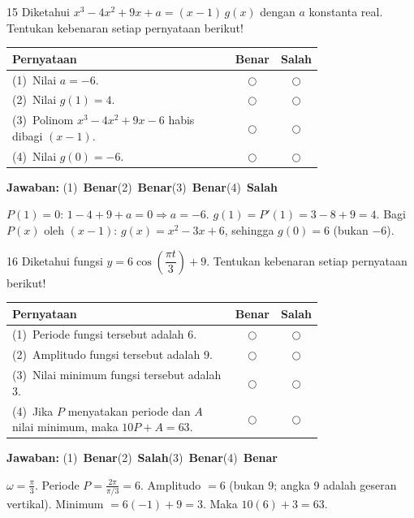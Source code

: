 \documentclass[11pt]{article}
\newcommand{\jawaban}[1]{%
  \noindent\colorbox{gold!30}{\parbox{\dimexpr\linewidth-2\fboxsep\relax}{%
    \textbf{Jawaban:} #1}}\par\smallskip}
\begin{document}
\begin{soal}{15}
Diketahui $x^3-4x^2+9x+a=(x-1)\,g(x)$ dengan $a$ konstanta real.
Tentukan kebenaran setiap pernyataan berikut!

\par\smallskip
{\renewcommand{\arraystretch}{1.4}%
\begin{tabular}{@{}p{0.76\linewidth}cc@{}}
\hline
\textbf{Pernyataan} & \textbf{Benar} & \textbf{Salah}\\
\hline
(1)~Nilai $a=-6$.
  & $\bigcirc$ & $\bigcirc$\\
(2)~Nilai $g(1)=4$.
  & $\bigcirc$ & $\bigcirc$\\
(3)~Polinom $x^3-4x^2+9x-6$ habis dibagi $(x-1)$.
  & $\bigcirc$ & $\bigcirc$\\
(4)~Nilai $g(0)=-6$.
  & $\bigcirc$ & $\bigcirc$\\
\hline
\end{tabular}}
\end{soal}
\begin{pembox}
\jawaban{(1)~\textbf{Benar}\quad(2)~\textbf{Benar}\quad(3)~\textbf{Benar}\quad(4)~\textbf{Salah}}
$P(1)=0$: $1-4+9+a=0\Rightarrow a=-6$. $g(1)=P'(1)=3-8+9=4$.
Bagi $P(x)$ oleh $(x-1)$: $g(x)=x^2-3x+6$, sehingga $g(0)=6$ (bukan $-6$).
\end{pembox}

\begin{soal}{16}
Diketahui fungsi $y=6\cos\!\left(\dfrac{\pi t}{3}\right)+9$.
Tentukan kebenaran setiap pernyataan berikut!

\par\smallskip
{\renewcommand{\arraystretch}{1.4}%
\begin{tabular}{@{}p{0.76\linewidth}cc@{}}
\hline
\textbf{Pernyataan} & \textbf{Benar} & \textbf{Salah}\\
\hline
(1)~Periode fungsi tersebut adalah 6.
  & $\bigcirc$ & $\bigcirc$\\
(2)~Amplitudo fungsi tersebut adalah 9.
  & $\bigcirc$ & $\bigcirc$\\
(3)~Nilai minimum fungsi tersebut adalah 3.
  & $\bigcirc$ & $\bigcirc$\\
(4)~Jika $P$ menyatakan periode dan $A$ nilai minimum, maka $10P+A=63$.
  & $\bigcirc$ & $\bigcirc$\\
\hline
\end{tabular}}
\end{soal}
\begin{pembox}
\jawaban{(1)~\textbf{Benar}\quad(2)~\textbf{Salah}\quad(3)~\textbf{Benar}\quad(4)~\textbf{Benar}}
$\omega=\tfrac{\pi}{3}$. Periode $P=\tfrac{2\pi}{\pi/3}=6$. Amplitudo $=6$ (bukan 9; angka 9 adalah geseran vertikal). Minimum $=6(-1)+9=3$. Maka $10(6)+3=63$.
\end{pembox}
\end{document}
